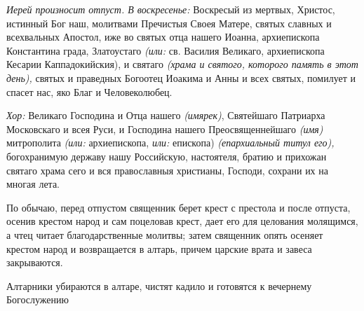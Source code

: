 \begin{mymulticols}
 {\itshape Иерей произносит отпуст. В воскресенье:} Воскресый из мертвых, Христос, истинный Бог наш, молитвами Пречистыя Своея Матере, святых славных и всехвальных Апостол, иже во святых отца нашего Иоанна, архиепископа Константина града, Златоустаго {\itshape (или:} св. Василия Великаго, архиепископа Кесарии Каппадокийския), и святаго {\itshape (храма и святого, которого память в этот день),} святых и праведных Богоотец Иоакима и Анны и всех святых, помилует и спасет нас, яко Благ и Человеколюбец.




 {\itshape Хор:} Великаго Господина и Отца нашего {\itshape (имярек)}, Святейшаго Патриарха Московскаго и всея Руси, и Господина нашего Преосвященнейшаго {\itshape (имя)} митрополита {\itshape (или:} архиепископа, {\itshape или:} епископа) {\itshape (епархиальный титул его),} богохранимую державу нашу Российскую, настоятеля, братию и прихожан святаго храма сего и вся православныя христианы, Господи, сохрани их на многая лета.


По обычаю, перед отпустом священник берет крест с престола и после отпуста, осенив крестом народ и сам поцеловав крест, дает его для целования молящимся, а чтец читает благодарственные молитвы; затем священник опять осеняет крестом народ и возвращается в алтарь, причем царские врата и завеса закрываются.


  Алтарники убираются в алтаре, чистят кадило и готовятся к вечернему Богослужению

\end{mymulticols}

\mychapterending

